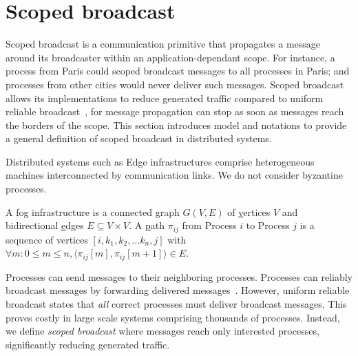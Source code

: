 

\vfill {}
\newpage

\section{Scoped broadcast}
\label{sec:scoped}

Scoped broadcast is a communication primitive that propagates a
message around its broadcaster within an application-dependant scope.
For instance, a process from Paris could scoped broadcast messages to
all processes in Paris; and processes from other cities would never
deliver such messages. Scoped broadcast allows its implementations to
reduce generated traffic compared to uniform reliable
broadcast~\cite{hadzilacos1994modular, raynal2013distributed}, for
message propagation can stop as soon as messages reach the borders of
the scope.  This section introduces model and notations to provide a
general definition of scoped broadcast in distributed
systems. 

Distributed systems such as Edge infrastructures comprise
heterogeneous machines interconnected by communication links. We do
not consider byzantine processes.

\begin{definition}
  A fog infrastructure is a connected \underline{g}raph $G(V, E)$ of
  \underline{v}ertices $V$ and bidirectional \underline{e}dges $E
  \subseteq V \times V$.  A \underline{p}ath $\pi_{ij}$ from Process
  $i$ to Process $j$ is a sequence of vertices $[i, k_1, k_2, \ldots
    k_n, j]$ with $\forall m: 0\leq m \leq n, \langle \pi_{ij}[m],
  \pi_{ij}[m+1] \rangle \in E$.
\end{definition}

Processes can send messages to their neighboring processes. Processes
can reliably broadcast messages by forwarding delivered
messages~\cite{birman1999bimodal, hadzilacos1994modular,
  nedelec2018causal, raynal2013distributed}. However, uniform reliable
broadcast states that \emph{all} correct processes must deliver
broadcast messages. This proves costly in large scale systems
comprising thousands of processes. Instead, we define \emph{scoped
broadcast} where messages reach only interested processes,
significantly reducing generated traffic.

